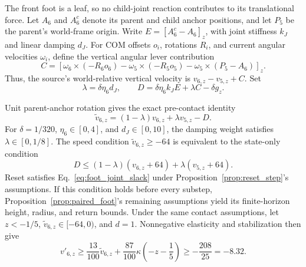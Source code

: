 The front foot is a leaf, so no child-joint reaction contributes to its translational force.
Let $A_6$ and $A^c_6$ denote its parent and child anchor positions, and let $P_5$ be the parent's world-frame origin.
Write $E=[A^c_6-A_6]_z$, with joint stiffness $k_J$ and linear damping $d_J$.
For COM offsets $o_i$, rotations $R_i$, and current angular velocities $\omega_i$, define the vertical angular lever contribution
\begin{equation}
 C=\left[\omega_6\mathbin{\times}(-R_6o_6)
       -\omega_5\mathbin{\times}(-R_5o_5)
       -\omega_5\mathbin{\times}(P_5-A_6)\right]_z.
\end{equation}
Thus, the source's world-relative vertical velocity is $v_{6,z}-v_{5,z}+C$.
Set
\begin{equation}
 \lambda=\delta\eta_6d_J,
 \qquad D=\delta\eta_6k_J E+\lambda C-\delta g_z.
\end{equation}

\begin{proposition}
\label{prop:foot_joint}
Unit parent-anchor rotation gives the exact pre-contact identity
\begin{equation}
 \widetilde v_{6,z}=(1-\lambda)v_{6,z}+\lambda v_{5,z}-D.
 \label{eq:foot_joint_velocity}
\end{equation}
For $\delta=1/320$, $\eta_6\in[0,4]$, and $d_J\in[0,10]$, the damping weight satisfies $\lambda\in[0,1/8]$.
The speed condition $\widetilde v_{6,z}\ge-64$ is equivalent to the state-only condition
\begin{equation}
 D\le(1-\lambda)(v_{6,z}+64)+\lambda(v_{5,z}+64).
 \label{eq:foot_joint_slack}
\end{equation}
Reset satisfies Eq.~\eqref{eq:foot_joint_slack} under Proposition~\ref{prop:reset_step}'s assumptions.
If this condition holds before every substep, Proposition~\ref{prop:paired_foot}'s remaining assumptions yield its finite-horizon height, radius, and return bounds.
Under the same contact assumptions, let $z<-1/5$, $\widetilde v_{6,z}\in[-64,0)$, and $d=1$.
Nonnegative elasticity and stabilization then give
\begin{equation}
 v'_{6,z}\ge\frac{13}{100}\widetilde v_{6,z}
       +\frac{87}{100}\kappa\left(-z-\frac15\right)\ge-\frac{208}{25}=-8.32.
\end{equation}
\end{proposition}

